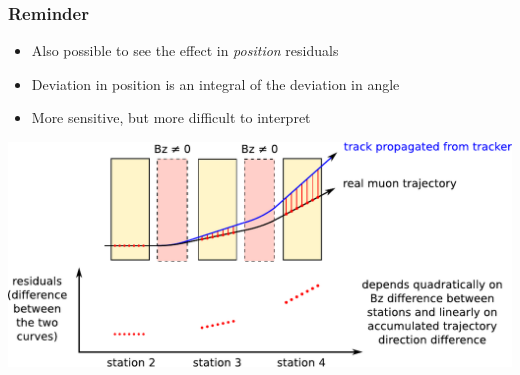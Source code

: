 \documentclass[compress]{beamer}
\begin{document}
\begin{frame}
\frametitle{Reminder}

\begin{itemize}
\item Also possible to see the effect in {\it position} residuals
\item Deviation in position is an integral of the deviation in angle
\item More sensitive, but more difficult to interpret
\end{itemize}

\vfill
\includegraphics[width=\linewidth]{paths.pdf}
\end{frame}
\end{document}
